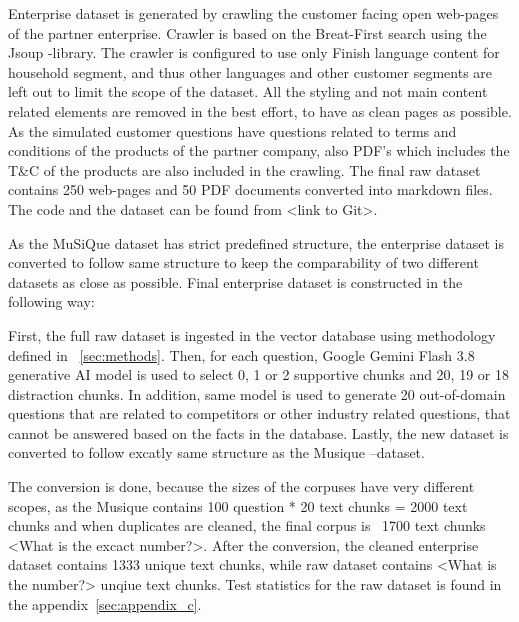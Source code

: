 
Enterprise dataset is generated by crawling the customer facing open web-pages of the partner enterprise. Crawler is based on the Breat-First search using the Jsoup -library. The crawler is configured to use only Finish language content for household segment, and thus other languages and other customer segments are left out to limit the scope of the dataset. All the styling and not main content related elements are removed in the best effort, to have as clean pages as possible. As the simulated customer questions have questions related to terms and conditions of the products of the partner company, also PDF's which includes the T\&C of the products are also included in the crawling. The final raw dataset contains 250 web-pages and 50 PDF documents converted into markdown files. The code and the dataset can be found from <link to Git>.

As the MuSiQue dataset has strict predefined structure, the enterprise dataset is converted to follow same structure to keep the comparability of two different datasets as close as possible. Final enterprise dataset is constructed in the following way:

First, the full raw dataset is ingested in the vector database using methodology defined in ~\ref{sec:methods}. Then, for each question, Google Gemini Flash 3.8 generative AI model is used to select 0, 1 or 2 supportive chunks and 20, 19 or 18 distraction chunks. In addition, same model is used to generate 20 out-of-domain questions that are related to competitors or other industry related questions, that cannot be answered based on the facts in the database. Lastly, the new dataset is converted to follow excatly same structure as the Musique --dataset.

The conversion is done, because the sizes of the corpuses have very different scopes, as the Musique contains 100 question * 20 text chunks = 2000 text chunks and when duplicates are cleaned, the final corpus is ~1700 text chunks <What is the excact number?>. After the conversion, the cleaned enterprise dataset contains 1333 unique text chunks, while raw dataset contains <What is the number?> unqiue text chunks. Test statistics for the raw dataset is found in the appendix~\ref{sec:appendix_c}.

